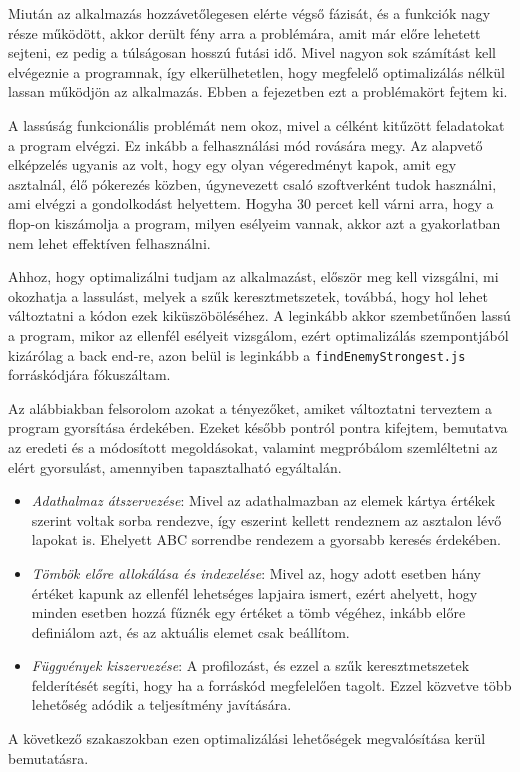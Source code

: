 
Miután az alkalmazás hozzávetőlegesen elérte végső fázisát, és a funkciók nagy része működött, akkor derült fény arra a problémára, amit már előre lehetett sejteni, ez pedig a túlságosan hosszú futási idő.
Mivel nagyon sok számítást kell elvégeznie a programnak, így elkerülhetetlen, hogy megfelelő optimalizálás nélkül lassan működjön az alkalmazás. Ebben a fejezetben ezt a problémakört fejtem ki.

A lassúság funkcionális problémát nem okoz, mivel a célként kitűzött feladatokat a program elvégzi. Ez inkább a felhasználási mód rovására megy. Az alapvető elképzelés ugyanis az volt, hogy egy olyan végeredményt kapok, amit egy asztalnál, élő pókerezés közben, úgynevezett csaló szoftverként tudok használni, ami elvégzi a gondolkodást helyettem. Hogyha 30 percet kell várni arra, hogy a flop-on kiszámolja a program, milyen esélyeim vannak, akkor azt a gyakorlatban nem lehet effektíven felhasználni.


Ahhoz, hogy optimalizálni tudjam az alkalmazást, először meg kell vizsgálni, mi okozhatja a lassulást, melyek a szűk keresztmetszetek, továbbá, hogy hol lehet változtatni a kódon ezek kiküszöböléséhez. A leginkább akkor szembetűnően lassú a program, mikor az ellenfél esélyeit vizsgálom, ezért optimalizálás szempontjából kizárólag a back end-re, azon belül is leginkább a \texttt{findEnemyStrongest.js} forráskódjára fókuszáltam.

Az alábbiakban felsorolom azokat a tényezőket, amiket változtatni terveztem a program gyorsítása érdekében. Ezeket később pontról pontra kifejtem, bemutatva az eredeti és a módosított megoldásokat, valamint megpróbálom szemléltetni az elért gyorsulást, amennyiben tapasztalható egyáltalán.
\begin{itemize}
    \item \textit{Adathalmaz átszervezése}: Mivel az adathalmazban az elemek kártya értékek szerint voltak sorba rendezve, így eszerint kellett rendeznem az asztalon lévő lapokat is. Ehelyett ABC sorrendbe rendezem a gyorsabb keresés érdekében.
    \item \textit{Tömbök előre allokálása és indexelése}: Mivel az, hogy adott esetben hány értéket kapunk az ellenfél lehetséges lapjaira ismert, ezért ahelyett, hogy minden esetben hozzá fűznék egy értéket a tömb végéhez, inkább előre definiálom azt, és az aktuális elemet csak beállítom.
    \item \textit{Függvények kiszervezése}: A profilozást, és ezzel a szűk keresztmetszetek felderítését segíti, hogy ha a forráskód megfelelően tagolt. Ezzel közvetve több lehetőség adódik a teljesítmény javítására.
\end{itemize}
A következő szakaszokban ezen optimalizálási lehetőségek megvalósítása kerül bemutatásra.

